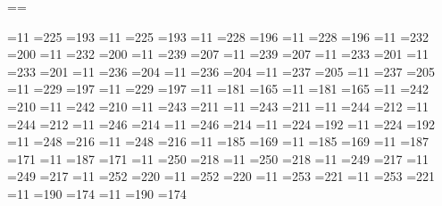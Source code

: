 %


\ifx\iltwoczech\undefined \else
  \czech=\iltwoczech  \slovak=\iltwoslovak
\fi

=11 =225 =193 %
=11 =225 =193 %
=11 =228 =196 %
=11 =228 =196 %
=11 =232 =200 %
=11 =232 =200 %
=11 =239 =207 %
=11 =239 =207 %
=11 =233 =201 %
=11 =233 =201 %
=11 =236 =204 %
=11 =236 =204 %
=11 =237 =205 %
=11 =237 =205 %
=11 =229 =197 %
=11 =229 =197 %
=11 =181 =165 %
=11 =181 =165 %
=11 =242 =210 %
=11 =242 =210 %
=11 =243 =211 %
=11 =243 =211 %
=11 =244 =212 %
=11 =244 =212 %
=11 =246 =214 %
=11 =246 =214 %
=11 =224 =192 %
=11 =224 =192 %
=11 =248 =216 %
=11 =248 =216 %
=11 =185 =169 %
=11 =185 =169 %
=11 =187 =171 %
=11 =187 =171 %
=11 =250 =218 %
=11 =250 =218 %
=11 =249 =217 %
=11 =249 =217 %
=11 =252 =220 %
=11 =252 =220 %
=11 =253 =221 %
=11 =253 =221 %
=11 =190 =174 %
=11 =190 =174 %

